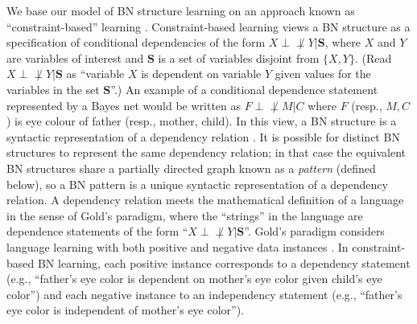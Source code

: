 \documentclass{elsarticle}%
\newcommand{\set}[1]{\{#1\}}
\newcommand{\dep}{\ensuremath{{\perp{}\!\!\!\!\!\!\!\not  \perp{}}}}
\begin{document}
We base our model of BN structure learning on an approach known as ``constraint-based''
learning \cite{cooper99:_comput_causat_discov}.
Constraint-based learning views a BN structure as a specification of conditional dependencies of the form $X \dep Y |\mathbf{S}$, where $X$ and $Y$ are variables of interest and $\mathbf{S}$ is a set of variables disjoint from $\set{X,Y}$.
 (Read $X \dep Y |\mathbf{S}$ as ``variable $X$ is dependent on variable $Y$ given values for the variables in the set $\mathbf{S}$''.) An example of a conditional dependence statement represented by a Bayes net would be written as $F \dep M | {C}$  where $F$ (resp., $M, C$) is  eye colour of father (resp., mother, child).
In this view, a BN structure is a syntactic representation of a dependency relation
	\cite[Sec.3.3]{pearl88:_probab_reason_intel_system}. It is possible for distinct BN structures to represent the same dependency relation; in that case the equivalent BN structures share a partially directed graph known as a {\em pattern} (defined below), so a BN pattern is a unique syntactic representation of a dependency relation. A dependency relation meets the mathematical definition of a language in the sense of Gold's paradigm, where the ``strings'' in the language are dependence statements of the form ``$X \dep Y |\mathbf{S}$''. Gold's paradigm considers language learning with both positive and negative data instances \cite{gold67limit,jain99:_system_that_learn}. In constraint-based BN learning, each positive instance corresponds to a dependency statement (e.g., ``father's eye color is dependent on mother's eye color given child's eye color'') and each negative instance to an independency statement (e.g., ``father's eye color is independent of mother's eye color''). 
	
\end{document}
